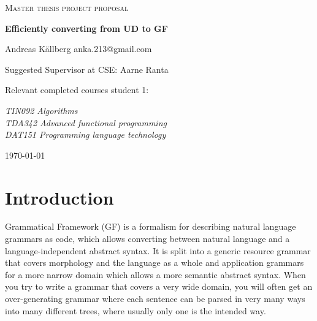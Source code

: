 \documentclass{article}
\begin{document}
\begin{titlepage}
  

\centering
  
  
{\scshape\LARGE Master thesis project proposal\\}
  
\vspace{0.5cm}
  
{\huge\bfseries Efficiently converting from UD to GF\\}
  
\vspace{2cm}
  
{\Large Andreas Källberg anka.213@gmail.com\\}
  
\vspace{1.0cm}
  
{\large Suggested Supervisor at CSE: Aarne Ranta\\}

\vspace{1.5cm}
  
{\large Relevant completed courses student 1:\par}
  
{\itshape 
    TIN092 Algorithms\\
    TDA342 Advanced functional programming\\
    DAT151 Programming language technology
\\}
    
    
  
\vfill

  

\vfill
  
{\large \today\\} 


\end{titlepage}

\section{Introduction}


Grammatical Framework\cite{ranta-2004} (GF) is a formalism for describing natural language grammars as code, which allows converting between natural language and a language-independent abstract syntax. It is split into a generic resource grammar that covers morphology and the language as a whole and application grammars for a more narrow domain which allows a more semantic abstract syntax. When you try to write a grammar that covers a very wide domain, you will often get an over-generating grammar where each sentence can be parsed in very many ways into many different trees, where usually only one is the intended way.
\end{document}
